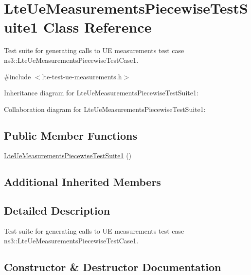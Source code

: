 \hypertarget{classLteUeMeasurementsPiecewiseTestSuite1}{}\section{Lte\+Ue\+Measurements\+Piecewise\+Test\+Suite1 Class Reference}
\label{classLteUeMeasurementsPiecewiseTestSuite1}


Test suite for generating calls to UE measurements test case ns3\+::\+Lte\+Ue\+Measurements\+Piecewise\+Test\+Case1.  




{\ttfamily \#include $<$lte-\/test-\/ue-\/measurements.\+h$>$}



Inheritance diagram for Lte\+Ue\+Measurements\+Piecewise\+Test\+Suite1\+:


Collaboration diagram for Lte\+Ue\+Measurements\+Piecewise\+Test\+Suite1\+:
\subsection*{Public Member Functions}
\begin{DoxyCompactItemize}
\item 
\hyperlink{classLteUeMeasurementsPiecewiseTestSuite1_a161d6540a5b2f012d0677c8791b9f409}{Lte\+Ue\+Measurements\+Piecewise\+Test\+Suite1} ()
\end{DoxyCompactItemize}
\subsection*{Additional Inherited Members}


\subsection{Detailed Description}
Test suite for generating calls to UE measurements test case ns3\+::\+Lte\+Ue\+Measurements\+Piecewise\+Test\+Case1. 

\subsection{Constructor \& Destructor Documentation}
